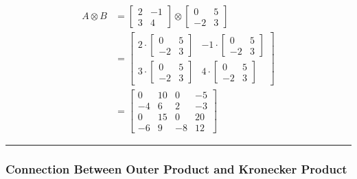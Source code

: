 \documentclass[
  letterpaper,
  DIV=11,
  numbers=noendperiod]{scrreprt}
\theoremstyle{plain}
\theoremstyle{definition}
\theoremstyle{remark}
\begin{document}
\begin{align*}
A \otimes B &= \begin{bmatrix}2&-1\\3&4\end{bmatrix} \otimes \begin{bmatrix}0&5\\-2&3\end{bmatrix} \\
&= \begin{bmatrix}
2 \cdot \begin{bmatrix}0&5\\-2&3\end{bmatrix} & -1 \cdot \begin{bmatrix}0&5\\-2&3\end{bmatrix} \\
3 \cdot \begin{bmatrix}0&5\\-2&3\end{bmatrix} & 4 \cdot \begin{bmatrix}0&5\\-2&3\end{bmatrix}
\end{bmatrix} \\
&= \begin{bmatrix}
0 & 10 & 0 & -5 \\
-4 & 6 & 2 & -3 \\
0 & 15 & 0 & 20 \\
-6 & 9 & -8 & 12
\end{bmatrix}
\end{align*}

\begin{center}\rule{0.5\linewidth}{0.5pt}\end{center}

\subsubsection*{Connection Between Outer Product and Kronecker
Product}\label{connection-between-outer-product-and-kronecker-product}
\end{document}
